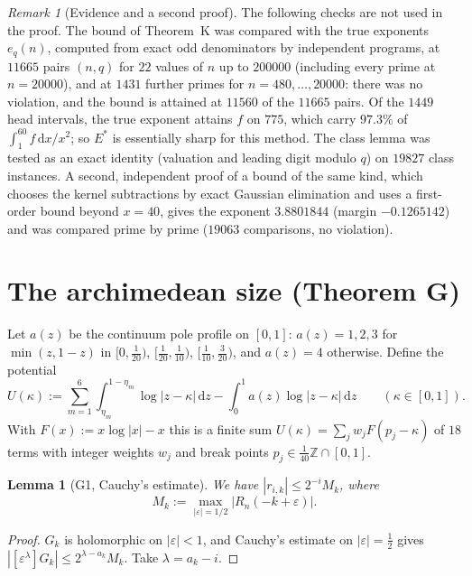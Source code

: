 \documentclass{amsart}
\newtheorem{lemma}[theorem]{Lemma}
\theoremstyle{definition}
\theoremstyle{remark}
\newtheorem{remark}[theorem]{Remark}
\numberwithin{equation}{section}
\newcommand{\Z}{\mathbb{Z}}
\newcommand{\dd}{\,\mathrm{d}}
\begin{document}
\begin{remark}[Evidence and a second proof]\label{rem:A-evidence}
The following checks are not used in the proof. The bound of Theorem~K was
compared with the true exponents $e_q(n)$, computed from exact odd
denominators by independent programs, at $11665$ pairs $(n,q)$ for $22$
values of $n$ up to $200000$ (including every prime at $n=20000$), and at
$1431$ further primes for $n=480,\dots,20000$: there was no violation, and
the bound is attained at $11560$ of the $11665$ pairs. Of the $1449$ head
intervals, the true exponent attains $f$ on $775$, which carry $97.3\%$ of
$\int_1^{60}f\dd x/x^2$; so $E^*$ is essentially sharp for this method. The
class lemma was tested as an exact identity (valuation and leading digit
modulo $q$) on $19827$ class instances. A second, independent proof of a
bound of the same kind, which chooses the kernel subtractions by exact
Gaussian elimination and uses a first-order bound beyond $x=40$, gives the
exponent $3.8801844$ (margin $-0.1265142$) and was compared prime by prime
($19063$ comparisons, no violation).
\end{remark}

\section{The archimedean size (Theorem G)}\label{sec:G}

Let $a(z)$ be the continuum pole profile on $[0,1]$: $a(z)=1,2,3$ for
$\min(z,1-z)$ in $[0,\frac1{20})$, $[\frac1{20},\frac1{10})$,
$[\frac1{10},\frac3{20})$, and $a(z)=4$ otherwise. Define the potential
\[
  U(\kappa):=\sum_{m=1}^{6}\int_{\eta_m}^{1-\eta_m}\log|z-\kappa|\dd z-\int_0^1a(z)\log|z-\kappa|\dd z
  \qquad(\kappa\in[0,1]).
\]
With $F(x):=x\log|x|-x$ this is a finite sum $U(\kappa)=\sum_jw_jF(p_j-\kappa)$
of $18$ terms with integer weights $w_j$ and break points
$p_j\in\frac1{40}\Z\cap[0,1]$.

\begin{lemma}[G1, Cauchy's estimate]\label{lem:G1}
We have $|r_{i,k}|\le2^{-i}M_k$, where
\[
  M_k:=\max_{|\varepsilon|=1/2}|R_n(-k+\varepsilon)| .
\]
\end{lemma}

\begin{proof}
$G_k$ is holomorphic on $|\varepsilon|<1$, and Cauchy's estimate on
$|\varepsilon|=\frac12$ \cite{Ahl79} gives
$|[\varepsilon^\lambda]G_k|\le2^{\lambda-a_k}M_k$. Take $\lambda=a_k-i$.
\end{proof}
\end{document}
